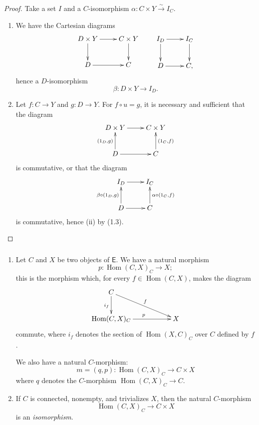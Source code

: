 \documentclass[10pt,oneside]{amsart}
\newcommand{\oldpage}[1]{\marginnote{\textbf{#1}}}
\newcommand{\cat}{\mathsf}
\DeclareMathOperator{\Hom}{Hom}
\begin{document}
\begin{proof}
Take a set $I$ and a $C$-isomorphism $\alpha:C\times Y\xrightarrow{\sim}I_C$.
\begin{enumerate}[label=(\roman*)]
  \item We have the Cartesian diagrams
    \[
      \xymatrix{
        D\times Y\ar[r]\ar[d] & C\times Y\ar[d]\\
        D\ar[r] & C
      }
      \qquad
      \xymatrix{
        I_D\ar[r]\ar[d] & I_C\ar[d]\\
        D\ar[r] & C,
      }
    \]
    hence a $D$-isomorphism
    \[
      \beta:D\times Y\longrightarrow I_D.
    \]
  \item Let $f:C\to Y$ and $g:D\to Y$.
    For $f\circ u=g$, it is necessary and sufficient that the diagram
    \[
      \xymatrix{
        D\times Y\ar[r] & C\times Y\\
        D\ar[u]^{(1_D,g)}\ar[r] & C\ar[u]_{(1_C,f)}
      }
    \]
    \oldpage{6} is commutative, or that the diagram
    \[
      \xymatrix{
        I_D\ar[r] & I_C\\
        D\ar[u]^{\beta\circ(1_D,g)}\ar[r] & C\ar[u]_{\alpha\circ(1_C,f)}
      }
    \]
    is commutative, hence (ii) by (1.3).
\end{enumerate}
\end{proof}

\subsubsection{}
\begin{enumerate}[label=(\roman*)]
  \item Let $C$ and $X$ be two objects of $\cat{E}$.
    We have a natural morphism
    \[
      p:\Hom(C,X)_C\longrightarrow X;
    \]
    this is the morphism which, for every $f\in\Hom(C,X)$, makes the diagram
    \[
      \xymatrix{
        C\ar[rrd]^f\ar[d]_{i_f}\\
        \Hom(C,X)_C\ar[rr]^p & & X
      }
    \]
    commute, where $i_f$ denotes the section of $\Hom(X,C)_C$ over $C$ defined by $f$.

    We also have a natural $C$-morphism:
    \[
      m=(q,p):\Hom(C,X)_C\longrightarrow C\times X
    \]
    where $q$ denotes the $C$-morphism $\Hom(C,X)_C\to C$.
  \item If $C$ is connected, nonempty, and trivializes $X$, then the natural $C$-morphism
    \[
      \Hom(C,X)_C\longrightarrow C\times X
    \]
    is an \emph{isomorphism}.
\end{enumerate}
\end{document}
